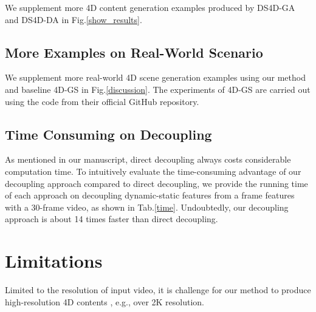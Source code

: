 We supplement more 4D content generation examples produced by DS4D-GA and DS4D-DA in Fig.\ref{show_results}. 






\subsection{More Examples on Real-World Scenario}

We supplement more real-world 4D scene generation examples using our method and baseline 4D-GS \cite{yang2023real} in Fig.\ref{discussion}. The experiments of 4D-GS are carried out using the code from their official GitHub repository.



\subsection{Time Consuming on Decoupling}
As mentioned in our manuscript, direct decoupling always costs considerable computation time. To intuitively evaluate the time-consuming advantage of our decoupling approach compared to direct decoupling, we provide the running time of each approach on decoupling dynamic-static features from a frame features with a 30-frame video, as shown in Tab.\ref{time}. Undoubtedly, our decoupling approach is about 14 times faster than direct decoupling.  
\begin{table}[]
	\centering
	\renewcommand\arraystretch{1.2}
	\caption{Comparison of running time with different decoupling approaches. All approaches are tested on a NVIDIA 3090 GPU.}
\label{time}
\end{table}


\section{Limitations}
Limited to the resolution of input video, it is challenge for our method to produce high-resolution 4D contents , e.g., over 2K resolution. 


\newpage

{
    \small
    
    
}